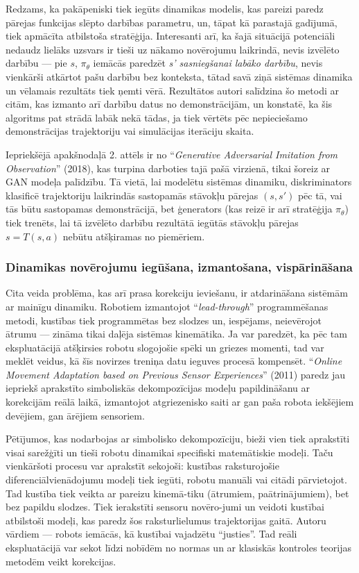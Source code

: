 \documentclass[12pt, a4paper]{article}
\numberwithin{equation}{section} %
\begin{document}
Redzams, ka pakāpeniski tiek iegūts dinamikas modelis, kas pareizi paredz pārejas funkcijas slēpto darbības parametru, un, tāpat kā parastajā gadījumā, tiek apmācīta atbilstoša stratēģija. Interesanti arī, ka šajā situācijā potenciāli nedaudz lielāks uzsvars ir tieši uz nākamo novērojumu laikrindā, nevis izvēlēto darbību --- pie $s$, $\pi_{\theta}$ iemācās paredzēt \textit{s' sasniegšanai labāko darbību}, nevis vienkārši atkārtot pašu darbību bez konteksta, tātad savā ziņā sistēmas dinamika un vēlamais rezultāts tiek ņemti vērā. Rezultātos autori salīdzina šo metodi ar citām, kas izmanto arī darbību datus no demonstrācijām, un konstatē, ka šis algoritms pat strādā labāk nekā tādas, ja tiek vērtēts pēc nepieciešamo demonstrācijas trajektoriju vai simulācijas iterāciju skaita.

Iepriekšējā apakšnodaļā 2. attēls ir no ``\textit{Generative Adversarial Imitation from Observation}'' \cite{torabi2018behavioral} (2018), kas turpina darboties tajā pašā virzienā, tikai šoreiz ar GAN modeļa palīdzību. Tā vietā, lai modelētu sistēmas dinamiku, diskriminators klasificē trajektoriju laikrindās sastopamās stāvokļu pārejas $(s, s')$ pēc tā, vai tās būtu sastopamas demonstrācijā, bet ģenerators (kas reizē ir arī stratēģija $\pi_{\theta}$) tiek trenēts, lai tā izvēlēto darbību rezultātā iegūtās stāvokļu pārejas $s=T(s,a)$ nebūtu atšķiramas no piemēriem.

\subsubsection{Dinamikas novērojumu iegūšana, izmantošana, vispārināšana} 

Cita veida problēma, kas arī prasa korekciju ieviešanu, ir atdarināšana sistēmām ar mainīgu dinamiku. Robotiem izmantojot ``\textit{lead-through}'' programmēšanas metodi, kustības tiek programmētas bez slodzes un, iespējams, neievērojot ātrumu --- zināma tikai daļēja sistēmas kinemātika. Ja var paredzēt, ka pēc tam ekspluatācijā atšķirsies robotu slogojošie spēki un griezes momenti, tad var meklēt veidus, kā šīs novirzes treniņa datu ieguves procesā kompensēt. ``\textit{Online Movement Adaptation based on Previous Sensor Experiences}'' \cite{pastor2011online} (2011) paredz jau iepriekš aprakstīto simboliskās dekompozīcijas modeļu papildināšanu ar korekcijām reālā laikā, izmantojot atgriezenisko saiti ar gan paša robota iekšējiem devējiem, gan ārējiem sensoriem. 

Pētījumos, kas nodarbojas ar simbolisko dekompozīciju, bieži vien tiek aprakstīti visai sarežģīti un tieši robotu dinamikai specifiski matemātiskie modeļi. Taču vienkāršoti procesu var aprakstīt sekojoši: kustības raksturojošie diferenciālvienādojumu modeļi tiek iegūti, robotu manuāli vai citādi pārvietojot. Tad kustība tiek veikta ar pareizu kinemā-tiku (ātrumiem, paātrinājumiem), bet bez papildu slodzes. Tiek ierakstīti sensoru novēro-jumi un veidoti kustībai atbilstoši modeļi, kas paredz šos raksturlielumus trajektorijas gaitā. Autoru vārdiem --- robots iemācās, kā kustībai vajadzētu ``justies''. Tad reāli ekspluatācijā var sekot līdzi nobīdēm no normas un ar klasiskās kontroles teorijas metodēm veikt korekcijas.
\end{document}
